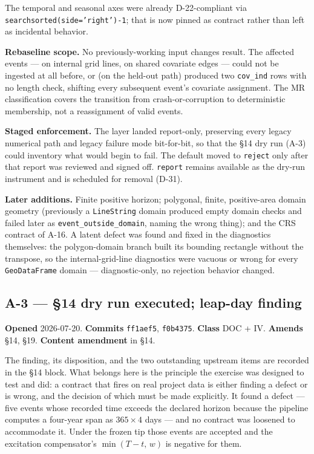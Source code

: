 \documentclass[
  10pt,
]{article}
\begin{document}
The temporal and seasonal axes were already D-22-compliant via \texttt{searchsorted(side='right')-1}; that is now pinned as contract rather than left as incidental behavior.

\textbf{Rebaseline scope.} No previously-working input changes result. The affected events --- on internal grid lines, on shared covariate edges --- could not be ingested at all before, or (on the held-out path) produced two \texttt{cov\_ind} rows with no length check, shifting every subsequent event's covariate assignment. The MR classification covers the transition from crash-or-corruption to deterministic membership, not a reassignment of valid events.

\textbf{Staged enforcement.} The layer landed report-only, preserving every legacy numerical path and legacy failure mode bit-for-bit, so that the §14 dry run (A-3) could inventory what would begin to fail. The default moved to \texttt{reject} only after that report was reviewed and signed off. \texttt{report} remains available as the dry-run instrument and is scheduled for removal (D-31).

\textbf{Later additions.} Finite positive horizon; polygonal, finite, positive-area domain geometry (previously a \texttt{LineString} domain produced empty domain checks and failed later as \texttt{event\_outside\_domain}, naming the wrong thing); and the CRS contract of A-16. A latent defect was found and fixed in the diagnostics themselves: the polygon-domain branch built its bounding rectangle without the transpose, so the internal-grid-line diagnostics were vacuous or wrong for every \texttt{GeoDataFrame} domain --- diagnostic-only, no rejection behavior changed.

\hypertarget{a-3}{%
\subsection{A-3 --- §14 dry run executed; leap-day finding}\label{a-3}}

\textbf{Opened} 2026-07-20. \textbf{Commits} \texttt{ff1aef5}, \texttt{f0b4375}. \textbf{Class} DOC + IV. \textbf{Amends} §14, §19. \textbf{Content amendment} in §14.

The finding, its disposition, and the two outstanding upstream items are recorded in the §14 block. What belongs here is the principle the exercise was designed to test and did: a contract that fires on real project data is either finding a defect or is wrong, and the decision of which must be made explicitly. It found a defect --- five events whose recorded time exceeds the declared horizon because the pipeline computes a four-year span as \(365 \times 4\) days --- and no contract was loosened to accommodate it. Under the frozen tip those events are accepted and the excitation compensator's \(\min(T-t,\,w)\) is negative for them.
\end{document}
